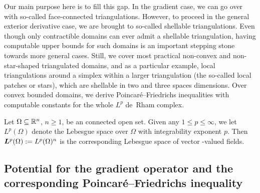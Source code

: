 \documentclass[10pt,letterpaper]{article}
\newcommand\cye[1]{%
  \protect\leavevmode
  \begingroup
    \color{red!35!yellow}%
    #1%
  \endgroup
}
\begin{document}
\cye{Our main purpose here is to fill this gap. In the gradient case, we can go over with so-called face-connected triangulations. However, to proceed} in the \cye{general exterior derivative case, we are brought to} so-called shellable triangulations. 
Even though only contractible domains can ever admit a shellable triangulation, 
having computable upper bounds for such domains is an important stepping stone towards more general cases. \cye{Still, we cover most practical non-convex and non-star-shaped triangulated domains, and as a particular example, local triangulations} around a simplex within a larger triangulation \cye{(the so-called local patches or stars), which are} shellable in two and three spaces dimensions. \cye{Over convex bounded domains, we derive Poincar\'e--Friedrichs inequalities with computable constants for the whole $L^{p}$ de~Rham complex.}

\cye{Let $\Omega \subseteq {\mathbb R}^n$, $n \geq 1$, be an connected open set.}  Given any $1 \leq p \leq \infty$, we let $L^{p}(\Omega)$ denote the Lebesgue space over $\Omega$ with integrability exponent $p$. Then $\bm{L}^{p}(\Omega) := L^{p}(\Omega)^{n}$ is the corresponding Lebesgue space of vector\cye{-valued} fields. 


\subsection{\cye{Potential for the gradient operator and the corresponding Poincar\'e--Friedrichs inequality}} \label{section:intro_grad}
\end{document}
